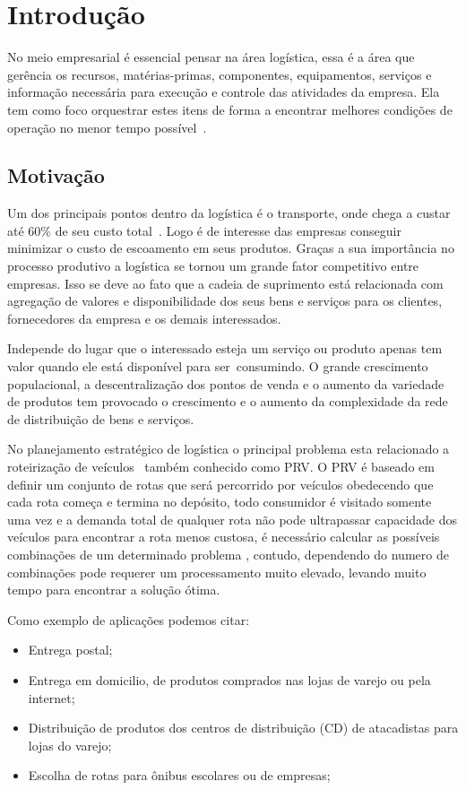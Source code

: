 \chapter[Introdução]{Introdução}

No meio empresarial é essencial pensar na área logística, essa é a área que gerência os recursos, matérias-primas, componentes, equipamentos, serviços e informação necessária para execução e controle das atividades da empresa. 
Ela tem como foco orquestrar estes itens de forma a encontrar melhores condições de operação no menor tempo possível~\cite{DIAS}.

\section{Motivação}

Um dos principais pontos dentro da logística é o transporte, onde chega a custar até 60\% de seu custo total~\cite{RODRIGUES}.
Logo é de interesse das empresas conseguir minimizar o custo de escoamento em seus produtos.
Graças a sua importância no processo produtivo a logística se tornou um grande fator competitivo entre empresas.
Isso se deve ao fato que a cadeia de suprimento está relacionada com agregação de valores e disponibilidade dos seus bens e serviços para os clientes, fornecedores da empresa e os demais interessados. 

Independe do lugar que o interessado esteja um serviço ou produto apenas tem valor quando ele está disponível para ser~consumindo\cite{TSUDA}.
O grande crescimento populacional, a descentralização dos pontos de venda e o aumento da variedade de produtos tem provocado o crescimento e o aumento da complexidade da rede de distribuição de bens e serviços.

No planejamento estratégico de logística o principal problema esta relacionado a roteirização de veículos~\cite{TSUDA} também conhecido como PRV\@.
O PRV é baseado em definir um conjunto de rotas que será percorrido por veículos obedecendo que cada rota começa e termina no depósito, todo consumidor é visitado somente uma vez e a demanda total de qualquer rota não pode ultrapassar capacidade dos veículos para encontrar a rota menos custosa, é necessário calcular as possíveis combinações de um determinado problema , contudo, dependendo do numero de combinações pode requerer um processamento muito elevado, levando muito tempo para encontrar a solução ótima.

Como exemplo de aplicações podemos citar:
\begin{itemize}
	\item Entrega postal;
	\item Entrega em domicilio, de produtos comprados nas lojas de varejo ou pela internet;
	\item Distribuição de produtos dos centros de distribuição (CD) de atacadistas para lojas do varejo;
	\item Escolha de rotas para ônibus escolares ou de empresas;
\end{itemize}

